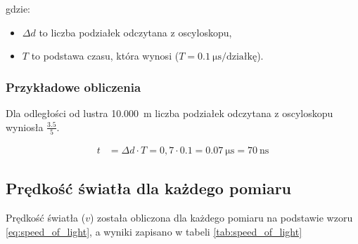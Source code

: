 \documentclass[a4paper,12pt]{article}
\begin{document}
gdzie:
\begin{itemize}
    \item $\Delta d$ to liczba podziałek odczytana z oscyloskopu,
    \item $T$ to podstawa czasu, która wynosi ($T = \SI{0.1}{\micro\second/\text{działkę}}$).
\end{itemize}

\begin{table}[h!]
    \centering
    \caption{Czas opóźnienia impulsu światła.}
    \label{tab:tabela_opóznień}
\end{table}

\subsubsection*{Przykładowe obliczenia}

Dla odległości od lustra \SI{10.000}{\meter} liczba podziałek odczytana z oscyloskopu wyniosła $\frac{3.5}{5}$.

\begin{align*}
    t & = \Delta d \cdot T = 0{,}7 \cdot 0.1 = \SI{0.07}{\micro\second} = \SI{70}{\nano\second}
\end{align*}

\subsection{Prędkość światła dla każdego pomiaru}

Prędkość światła ($v$) została obliczona dla każdego pomiaru na podstawie wzoru \eqref{eq:speed_of_light}, a wyniki zapisano w tabeli \ref{tab:speed_of_light}
\end{document}
